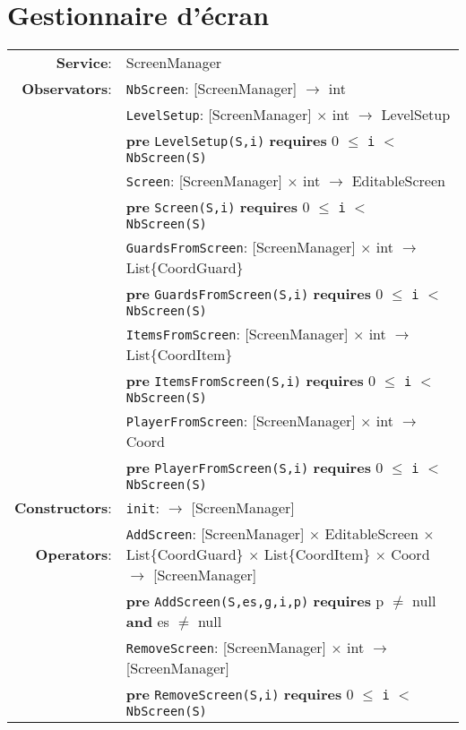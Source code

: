 \documentclass[7pt]{article}
\begin{document}
\section*{Gestionnaire d'écran}

\begin{tabular}{rl}
\textbf{Service}: & \textrm{ScreenManager}  \\
\textbf{Observators}: & \texttt{NbScreen}: \textrm{[ScreenManager]} $\rightarrow$ \textrm{int} \\
& \texttt{LevelSetup}: \textrm{[ScreenManager]} $\times$ \textrm{int} $\rightarrow$ \textrm{LevelSetup} \\
& \quad \textbf{pre } \texttt{LevelSetup(S,i)} \textbf{ requires } 0 $\leq$ \texttt{i} $<$ \texttt{NbScreen(S)}\\
& \texttt{Screen}: \textrm{[ScreenManager]} $\times$ \textrm{int} $\rightarrow$ \textrm{EditableScreen} \\
& \quad \textbf{pre } \texttt{Screen(S,i)} \textbf{ requires } 0 $\leq$ \texttt{i} $<$ \texttt{NbScreen(S)}\\
& \texttt{GuardsFromScreen}: \textrm{[ScreenManager]} $\times$ \textrm{int} $\rightarrow$ \textrm{List\{CoordGuard\}} \\
& \quad \textbf{pre } \texttt{GuardsFromScreen(S,i)} \textbf{ requires } 0 $\leq$ \texttt{i} $<$ \texttt{NbScreen(S)}\\
& \texttt{ItemsFromScreen}: \textrm{[ScreenManager]} $\times$ \textrm{int} $\rightarrow$ \textrm{List\{CoordItem\}} \\
& \quad \textbf{pre } \texttt{ItemsFromScreen(S,i)} \textbf{ requires } 0 $\leq$ \texttt{i} $<$ \texttt{NbScreen(S)}\\
& \texttt{PlayerFromScreen}: \textrm{[ScreenManager]} $\times$ \textrm{int} $\rightarrow$ \textrm{Coord} \\
& \quad \textbf{pre } \texttt{PlayerFromScreen(S,i)} \textbf{ requires } 0 $\leq$ \texttt{i} $<$ \texttt{NbScreen(S)}\\
\textbf{Constructors}: & \texttt{init}: $\rightarrow$ \textrm{[ScreenManager]} \\
\textbf{Operators}: & \texttt{AddScreen}: \textrm{[ScreenManager]} $\times$ \textrm{EditableScreen} $\times$ \textrm{List\{CoordGuard\}}   $\times$ \textrm{List\{CoordItem\}} $\times$  \textrm{Coord} $\rightarrow$ \textrm{[ScreenManager]} \\
& \quad \textbf{pre } \texttt{AddScreen(S,es,g,i,p)} \textbf{ requires } p $\neq$ null \textbf{and} es $\neq$ null \\
& \texttt{RemoveScreen}: \textrm{[ScreenManager]} $\times$ \textrm{int}  $\rightarrow$ \textrm{[ScreenManager]} \\
& \quad \textbf{pre } \texttt{RemoveScreen(S,i)} \textbf{ requires } 0 $\leq$ \texttt{i} $<$ \texttt{NbScreen(S)} \\


\end{tabular}
\end{document}
